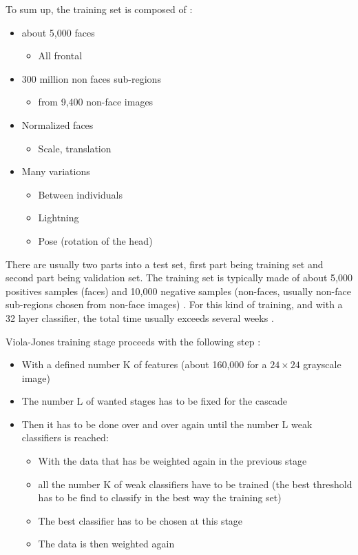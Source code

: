 \noindent To sum up, the training set is composed of \cite{UBC01}:

\begin{itemize}
  \item about 5,000 faces
  \begin{itemize}
  	\item All frontal
  \end{itemize}
  \item 300 million non faces sub-regions
  \begin{itemize}
  	\item from 9,400 non-face images
  \end{itemize}
  \item Normalized faces
  \begin{itemize}
  	\item Scale, translation
  \end{itemize}
  \item Many variations
  \begin{itemize}
  	\item Between individuals
	\item Lightning
	\item Pose (rotation of the head)
  \end{itemize}
\end{itemize}

\vspace{\baselineskip}
\noindent There are usually two parts into a test set, first part being training set and second part being validation set. The training set is typically made of about 5,000 positives samples (faces) and 10,000 negative samples (non-faces, usually non-face sub-regions chosen from non-face images) \cite{DIN08}. For this kind of training, and with a 32 layer classifier, the total time usually exceeds several weeks \cite{VIO01}.
\newline

\noindent Viola-Jones training stage proceeds with the following step \cite{DIN08}:

\begin{itemize}
  \item With a defined number K of features (about 160,000 for a $ 24\times24 $ grayscale image)
  \item The number L of wanted stages has to be fixed for the cascade
  \item Then it has to be done over and over again until the number L weak classifiers is reached:
  \begin{itemize}
  	\item With the data that has be weighted again in the previous stage
	\item all the number K of weak classifiers have to be trained (the best threshold has to be find to classify in the best way the training set)
	\item The best classifier has to be chosen at this stage
	\item The data is then weighted again
  \end{itemize}
\end{itemize}

